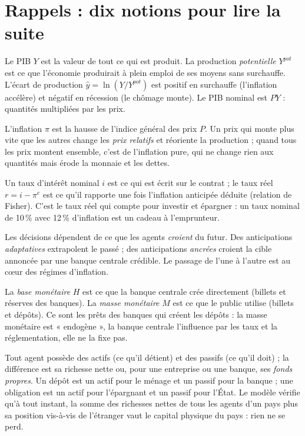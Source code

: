 \documentclass[11pt,a4paper]{article}
\begin{document}
\section{Rappels : dix notions pour lire la suite}
\label{sec:rappels}
\begin{description}[style=nextline,leftmargin=1.2em]
\item[PIB, production potentielle, écart de production.] Le PIB $Y$ est la valeur de tout ce qui est produit. La production \emph{potentielle} $Y^{pot}$ est ce que l'économie produirait à plein emploi de ses moyens sans surchauffe. L'écart de production $\hat y=\ln(Y/Y^{pot})$ est positif en surchauffe (l'inflation accélère) et négatif en récession (le chômage monte). Le PIB nominal est $PY$ : quantités multipliées par les prix.
\item[Inflation, prix relatifs, indice des prix.] L'inflation $\pi$ est la hausse de l'indice général des prix $P$. Un prix qui monte plus vite que les autres change les \emph{prix relatifs} et réoriente la production ; quand tous les prix montent ensemble, c'est de l'inflation pure, qui ne change rien aux quantités mais érode la monnaie et les dettes.
\item[Taux nominal et taux réel.] Un taux d'intérêt nominal $i$ est ce qui est écrit sur le contrat ; le taux réel $r = i - \pi^e$ est ce qu'il rapporte une fois l'inflation anticipée déduite (relation de Fisher). C'est le taux réel qui compte pour investir et épargner : un taux nominal de 10\,\% avec 12\,\% d'inflation est un cadeau à l'emprunteur.
\item[Anticipations.] Les décisions dépendent de ce que les agents \emph{croient} du futur. Des anticipations \emph{adaptatives} extrapolent le passé ; des anticipations \emph{ancrées} croient la cible annoncée par une banque centrale crédible. Le passage de l'une à l'autre est au cœur des régimes d'inflation.
\item[Monnaie : base et masse.] La \emph{base monétaire} $H$ est ce que la banque centrale crée directement (billets et réserves des banques). La \emph{masse monétaire} $M$ est ce que le public utilise (billets et dépôts). Ce sont les prêts des banques qui créent les dépôts : la masse monétaire est « endogène », la banque centrale l'influence par les taux et la réglementation, elle ne la fixe pas.
\item[Bilan, actif, passif, fonds propres.] Tout agent possède des actifs (ce qu'il détient) et des passifs (ce qu'il doit) ; la différence est sa richesse nette ou, pour une entreprise ou une banque, ses \emph{fonds propres}. Un dépôt est un actif pour le ménage et un passif pour la banque ; une obligation est un actif pour l'épargnant et un passif pour l'État. Le modèle vérifie qu'à tout instant, la somme des richesses nettes de tous les agents d'un pays plus sa position vis-à-vis de l'étranger vaut le capital physique du pays : rien ne se perd.

\end{description}
\end{document}
